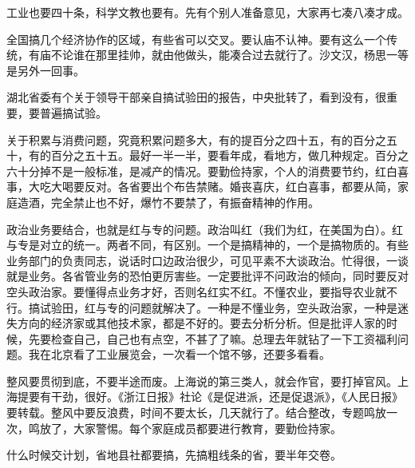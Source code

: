 工业也要四十条，科学文教也要有。先有个别人准备意见，大家再七凑八凑才成。

全国搞几个经济协作的区域，有些省可以交叉。要认庙不认神。要有这么一个传统，有庙不论谁在那里挂帅，就由他做头，能凑合过去就行了。沙文汉，杨思一等是另外一回事。

湖北省委有个关于领导干部亲自搞试验田的报告，中央批转了，看到没有，很重要，要普遍搞试验。

关于积累与消费问题，究竟积累问题多大，有的提百分之四十五，有的百分之五十，有的百分之五十五。最好一半一半，要看年成，看地方，做几种规定。百分之六十分掉不是一般标准，是减产的情况。要勤俭持家，个人的消费要节约，红白喜事，大吃大喝要反对。各省要出个布告禁赌。婚丧喜庆，红白喜事，都要从简，家庭造酒，完全禁止也不好，爆竹不要禁了，有振奋精神的作用。

政治业务要结合，也就是红与专的问题。政治叫红（我们为红，在美国为白）。红与专是对立的统一。两者不同，有区别。一个是搞精神的，一个是搞物质的。有些业务部门的负责同志，说话时口边政治很少，可见平素不大谈政治。忙得很，一谈就是业务。各省管业务的恐怕更厉害些。一定要批评不问政治的倾向，同时要反对空头政治家。要懂得点业务才好，否则名红实不红。不懂农业，要指导农业就不行。搞试验田，红与专的问题就解决了。一种是不懂业务，空头政治家，一种是迷失方向的经济家或其他技术家，都是不好的。要去分析分析。但是批评人家的时候，先要检查自己，自己也有点空，不甚了了嘛。总理去年就钻了一下工资福利问题。我在北京看了工业展览会，一次看一个馆不够，还要多看看。

整风要贯彻到底，不要半途而废。上海说的第三类人，就会作官，要打掉官风。上海提要有干劲，很好。《浙江日报》社论《是促进派，还是促退派》，《人民日报》要转载。整风中要反浪费，时间不要太长，几天就行了。结合整改，专题鸣放一次，鸣放了，大家警惕。每个家庭成员都要进行教育，要勤俭持家。

什么时候交计划，省地县社都要搞，先搞粗线条的省，要半年交卷。


